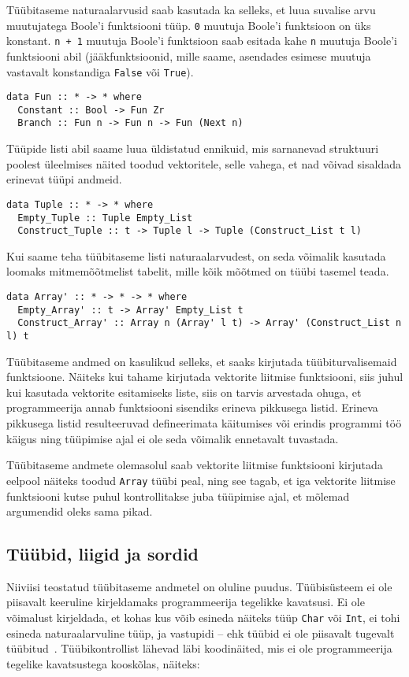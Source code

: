 \documentclass[12pt]{article}
\begin{document}
      Tüübitaseme naturaalarvusid saab kasutada ka selleks, et luua suvalise arvu muutujatega Boole'i funktsiooni tüüp. \verb!0! muutuja Boole'i funktsioon on üks konstant. \verb!n + 1! muutuja Boole'i funktsioon saab esitada kahe \verb!n! muutuja Boole'i funktsiooni abil (jääkfunktsioonid, mille saame, asendades esimese muutuja vastavalt konstandiga \verb!False! või \verb!True!).

      \begin{verbatim}data Fun :: * -> * where
  Constant :: Bool -> Fun Zr
  Branch :: Fun n -> Fun n -> Fun (Next n)\end{verbatim}

      Tüüpide listi abil saame luua üldistatud ennikuid, mis sarnanevad struktuuri poolest üleelmises näited toodud vektoritele, selle vahega, et nad võivad sisaldada erinevat tüüpi andmeid.

      \begin{verbatim}data Tuple :: * -> * where
  Empty_Tuple :: Tuple Empty_List
  Construct_Tuple :: t -> Tuple l -> Tuple (Construct_List t l)\end{verbatim}

      Kui saame teha tüübitaseme listi naturaalarvudest, on seda võimalik kasutada loomaks mitmemõõtmelist tabelit, mille kõik mõõtmed on tüübi tasemel teada.

      \begin{verbatim}data Array' :: * -> * -> * where
  Empty_Array' :: t -> Array' Empty_List t
  Construct_Array' :: Array n (Array' l t) -> Array' (Construct_List n l) t\end{verbatim}

      Tüübitaseme andmed on kasulikud selleks, et saaks kirjutada tüübiturvalisemaid funktsioone. Näiteks kui tahame kirjutada vektorite liitmise funktsiooni, siis juhul kui kasutada vektorite esitamiseks liste, siis on tarvis arvestada ohuga, et programmeerija annab funktsiooni sisendiks erineva pikkusega listid. Erineva pikkusega listid resulteeruvad defineerimata käitumises või erindis programmi töö käigus ning tüüpimise ajal ei ole seda võimalik ennetavalt tuvastada.

      Tüübitaseme andmete olemasolul saab vektorite liitmise funktsiooni kirjutada eelpool näiteks toodud \verb!Array! tüübi peal, ning see tagab, et iga vektorite liitmise funktsiooni kutse puhul kontrollitakse juba tüüpimise ajal, et mõlemad argumendid oleks sama pikad.
    \subsection{Tüübid, liigid ja sordid}
      Niiviisi teostatud tüübitaseme andmetel on oluline puudus. Tüübisüsteem ei ole piisavalt keeruline kirjeldamaks programmeerija tegelikke kavatsusi. Ei ole võimalust kirjeldada, et kohas kus võib esineda näiteks tüüp \verb!Char! või \verb!Int!, ei tohi esineda naturaalarvuline tüüp, ja vastupidi -- ehk tüübid ei ole piisavalt tugevalt tüübitud~\cite{Giv}. Tüübikontrollist lähevad läbi koodinäited, mis ei ole programmeerija tegelike kavatsustega kooskõlas, näiteks:
\end{document}
